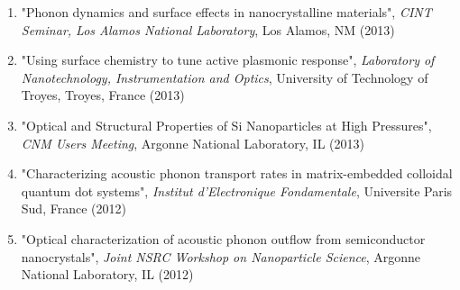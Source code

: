 \documentclass[12pt]{nuthesis}	%
\begin{document}
\begin{vita}
\begin{enumerate}
\item "Phonon dynamics and surface effects in nanocrystalline materials", \emph{CINT Seminar, Los Alamos National Laboratory}, Los Alamos, NM (2013)
\item "Using surface chemistry to tune active plasmonic response", \emph{Laboratory of Nanotechnology, Instrumentation and Optics}, University of Technology of Troyes, Troyes, France (2013)
\item "Optical and Structural Properties of Si Nanoparticles at High Pressures", \emph{CNM Users Meeting}, Argonne National Laboratory, IL (2013)
\item "Characterizing acoustic phonon transport rates in matrix-embedded colloidal quantum dot systems", \emph{Institut d'Electronique Fondamentale}, Universite Paris Sud, France (2012)
\item "Optical characterization of acoustic phonon outflow from semiconductor nanocrystals", \emph{Joint NSRC Workshop on Nanoparticle Science}, Argonne National Laboratory, IL (2012)
\end{enumerate}
\endgroup

\end{vita}
\end{document}
